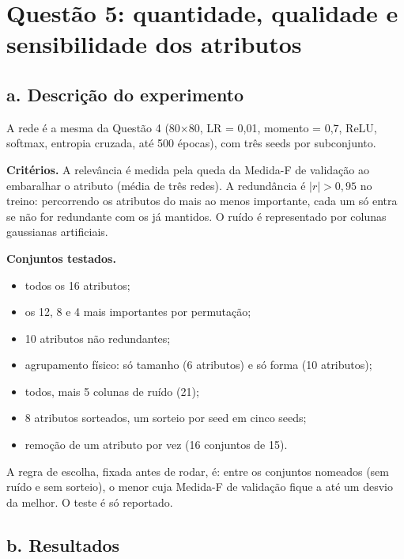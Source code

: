 \section{Questão 5: quantidade, qualidade e sensibilidade dos atributos}

\subsection*{a. Descrição do experimento}

A rede é a mesma da Questão 4 (80$\times$80, LR = 0,01, momento = 0,7, ReLU, softmax, entropia cruzada, até 500 épocas), com três seeds por subconjunto.

\textbf{Critérios.} A relevância é medida pela queda da Medida-F de validação ao embaralhar o atributo (média de três redes). A redundância é $|r| > 0{,}95$ no treino: percorrendo os atributos do mais ao menos importante,
cada um só entra se não for redundante com os já mantidos. O ruído é representado por colunas gaussianas artificiais.

\textbf{Conjuntos testados.}
\begin{itemize}
  \item todos os 16 atributos;
  \item os 12, 8 e 4 mais importantes por permutação;
  \item 10 atributos não redundantes;
  \item agrupamento físico: só tamanho (6 atributos) e só forma (10 atributos);
  \item todos, mais 5 colunas de ruído (21);
  \item 8 atributos sorteados, um sorteio por seed em cinco seeds;
  \item remoção de um atributo por vez (16 conjuntos de 15).
\end{itemize}

A regra de escolha, fixada antes de rodar, é: entre os conjuntos nomeados (sem ruído e sem sorteio), o menor cuja Medida-F de validação fique a até um desvio da melhor. O teste é só reportado.

\subsection*{b. Resultados}


